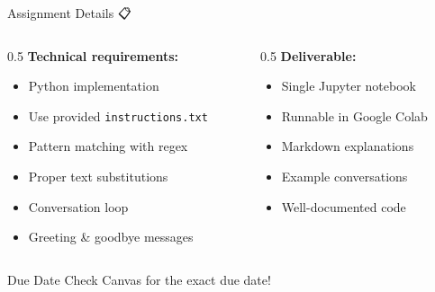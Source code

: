 \documentclass[aspectratio=169]{beamer}
\begin{document}
\begin{frame}[shrink=10]{Assignment Details 📋}
\small
\begin{columns}
\begin{column}{0.5\textwidth}
\textbf{Technical requirements:}
\begin{itemize}\setlength{\itemsep}{0pt}
    \item Python implementation
    \item Use provided \texttt{instructions.txt}
    \item Pattern matching with regex
    \item Proper text substitutions
    \item Conversation loop
    \item Greeting \& goodbye messages
\end{itemize}
\end{column}

\begin{column}{0.5\textwidth}
\textbf{Deliverable:}
\begin{itemize}\setlength{\itemsep}{0pt}
    \item Single Jupyter notebook
    \item Runnable in Google Colab
    \item Markdown explanations
    \item Example conversations
    \item Well-documented code
\end{itemize}
\end{column}
\end{columns}

\vspace{0.3cm}

\begin{block}{Due Date}
Check Canvas for the exact due date!
\end{block}
\end{frame}
\end{document}
